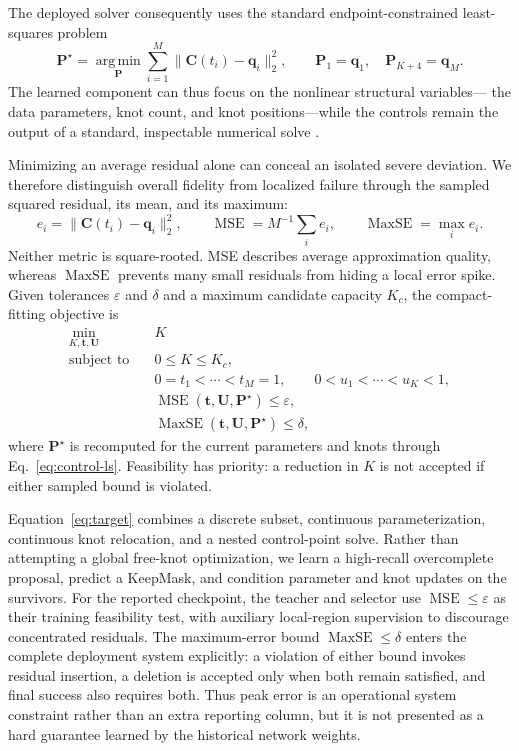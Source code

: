 \documentclass[preprint,12pt]{elsarticle}
\newcommand{\MSE}{\operatorname{MSE}}
\newcommand{\Peak}{\operatorname{MaxSE}}
\begin{document}
The deployed solver consequently uses the standard endpoint-constrained
least-squares problem
\begin{equation}
\bm P^\star=\underset{\bm P}{\operatorname{arg\,min}}
\sum_{i=1}^{M}\|\bm C(t_i)-\bm q_i\|_2^2,\qquad
\bm P_1=\bm q_1,\quad \bm P_{K+4}=\bm q_M .
\label{eq:control-ls}
\end{equation}
The learned component can thus focus on the nonlinear structural variables---
the data parameters, knot count, and knot positions---while the controls remain
the output of a standard, inspectable numerical solve
\cite{piegl1997,yeh2020}.

Minimizing an average residual alone can conceal an isolated severe deviation.
We therefore distinguish overall fidelity from localized failure through the
sampled squared residual, its mean, and its maximum:
\begin{equation}
e_i=\|\bm C(t_i)-\bm q_i\|_2^2,\qquad
\MSE=M^{-1}\sum_i e_i,\qquad \Peak=\max_i e_i.
\end{equation}
Neither metric is square-rooted. MSE describes average approximation quality,
whereas $\Peak$ prevents many small residuals from hiding a local error spike.
Given tolerances $\varepsilon$ and $\delta$ and a maximum candidate capacity
$K_c$, the compact-fitting objective is
\begin{equation}
\begin{aligned}
\min_{K,\bm t,\bm U}\quad &K\\
\text{subject to}\quad
&0\leq K\leq K_c,\\
&0=t_1<\cdots<t_M=1,\qquad 0<u_1<\cdots<u_K<1,\\
&\MSE(\bm t,\bm U,\bm P^\star)\leq\varepsilon,\\
&\Peak(\bm t,\bm U,\bm P^\star)\leq\delta,
\end{aligned}
\label{eq:target}
\end{equation}
where $\bm P^\star$ is recomputed for the current parameters and knots through
Eq.~\eqref{eq:control-ls}. Feasibility has priority: a reduction in $K$ is not
accepted if either sampled bound is violated.

Equation~\eqref{eq:target} combines a discrete subset, continuous
parameterization, continuous knot relocation, and a nested control-point
solve. Rather than attempting a global free-knot optimization, we learn a
high-recall overcomplete proposal, predict a KeepMask, and condition parameter
and knot updates on the survivors. For the reported checkpoint, the teacher
and selector use $\MSE\leq\varepsilon$ as their training feasibility test,
with auxiliary local-region supervision to discourage concentrated residuals.
The maximum-error bound $\Peak\leq\delta$ enters the complete deployment
system explicitly: a violation of either bound invokes residual insertion, a
deletion is accepted only when both remain satisfied, and final success also
requires both. Thus peak error is an operational system constraint rather than
an extra reporting column, but it is not presented as a hard guarantee learned
by the historical network weights.
\end{document}
